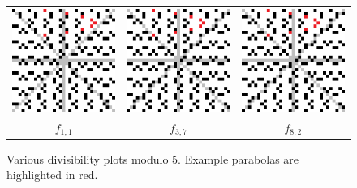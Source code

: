 \documentclass{article}
\begin{document}
\begin{figure}[h!]
	\centering
	\begin{tabular}{ccc}
		\includegraphics[scale=0.5]{m1_n1_p5_d} & \includegraphics[scale=0.5]{m3_n7_p5_d} & \includegraphics[scale=0.5]{m8_n2_p5_d} \\
		\(f_{1,1}\) & \(f_{3,7}\) & \(f_{8,2}\)
	\end{tabular}
	\caption{Various divisibility plots modulo 5. Example parabolas are highlighted in red.}
	\label{parabolas}
\end{figure}
\end{document}
